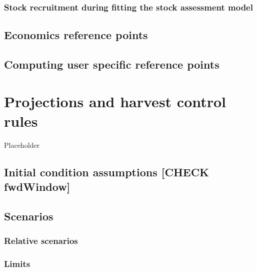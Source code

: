 \documentclass[
]{book}
\begin{document}
\hypertarget{stock-recruitment-during-fitting-the-stock-assessment-model}{%
\subsection{Stock recruitment during fitting the stock assessment model}\label{stock-recruitment-during-fitting-the-stock-assessment-model}}

\hypertarget{economics-reference-points}{%
\section{Economics reference points}\label{economics-reference-points}}

\hypertarget{computing-user-specific-reference-points}{%
\section{Computing user specific reference points}\label{computing-user-specific-reference-points}}

\hypertarget{projections-and-harvest-control-rules}{%
\chapter{Projections and harvest control rules}\label{projections-and-harvest-control-rules}}

Placeholder

\hypertarget{initial-condition-assumptions-check-fwdwindow}{%
\section{Initial condition assumptions {[}CHECK fwdWindow{]}}\label{initial-condition-assumptions-check-fwdwindow}}

\hypertarget{scenarios}{%
\section{Scenarios}\label{scenarios}}

\hypertarget{relative-scenarios}{%
\subsection{Relative scenarios}\label{relative-scenarios}}

\hypertarget{limits}{%
\subsection{Limits}\label{limits}}
\end{document}
